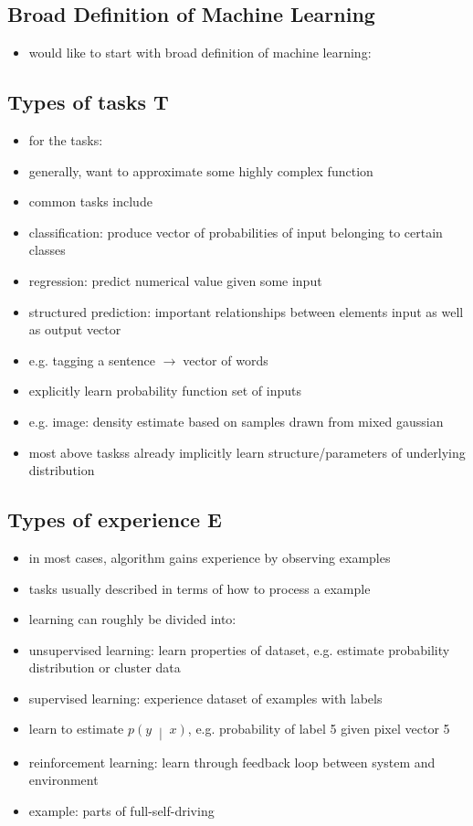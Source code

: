 \documentclass{article}
\newcommand{\arrow}{$\rightarrow\;$}
\renewcommand{\c}[2]{\left(#1\;\middle|\;#2\right)}
\begin{document}
\subsection*{Broad Definition of Machine Learning}
\begin{itemize}
    \item would like to start with broad definition of machine learning:
\end{itemize}

\subsection*{Types of tasks T}
\begin{itemize}
    \item for the tasks:
    \item generally, want to approximate some highly complex function
    \item common tasks include
    \item classification: produce vector of probabilities of input belonging to certain classes
    \item regression: predict numerical value given some input
    \item structured prediction: important relationships between elements input as well as output vector
    \item e.g. tagging a sentence \arrow vector of words
    \item explicitly learn probability function set of inputs
    \item e.g. image: density estimate based on samples drawn from mixed gaussian
    \item most above taskss already implicitly learn structure/parameters of underlying distribution
\end{itemize}

\subsection*{Types of experience E}
\begin{itemize}
    \item in most cases, algorithm gains experience by observing examples
    \item tasks usually described in terms of how to process a example
    \item learning can roughly be divided into:
    \item unsupervised learning: learn properties of dataset, e.g. estimate probability distribution or cluster data
    \item supervised learning: experience dataset of examples with labels
    \item learn to estimate $p\c{y}{x}$, e.g. probability of label 5 given pixel vector 5
    \item reinforcement learning: learn through feedback loop between system and environment
    \item example: parts of full-self-driving
\end{itemize}
\end{document}
